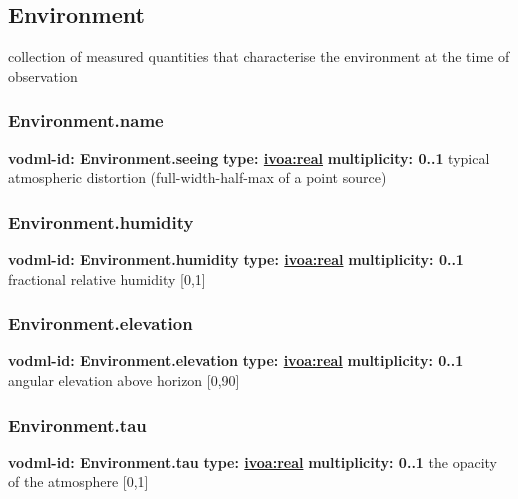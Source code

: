   \subsection{Environment}
  \label{sect:Environment}
    collection of measured quantities that characterise the environment at the time of observation

    \subsubsection{Environment.name}
      \textbf{vodml-id: Environment.seeing} \newline
      \textbf{type: \hyperref[sect:ivoa]{ivoa:real}} \newline
      \textbf{multiplicity: 0..1} \newline
      typical atmospheric distortion (full-width-half-max of a point source)

    \subsubsection{Environment.humidity}
      \textbf{vodml-id: Environment.humidity} \newline
      \textbf{type: \hyperref[sect:ivoa]{ivoa:real}} \newline
      \textbf{multiplicity: 0..1} \newline
      fractional relative humidity [0,1]

    \subsubsection{Environment.elevation}
      \textbf{vodml-id: Environment.elevation} \newline
      \textbf{type: \hyperref[sect:ivoa]{ivoa:real}} \newline
      \textbf{multiplicity: 0..1} \newline
      angular elevation above horizon [0,90]

    \subsubsection{Environment.tau}
      \textbf{vodml-id: Environment.tau} \newline
      \textbf{type: \hyperref[sect:ivoa]{ivoa:real}} \newline
      \textbf{multiplicity: 0..1} \newline
      the opacity of the atmosphere [0,1]

